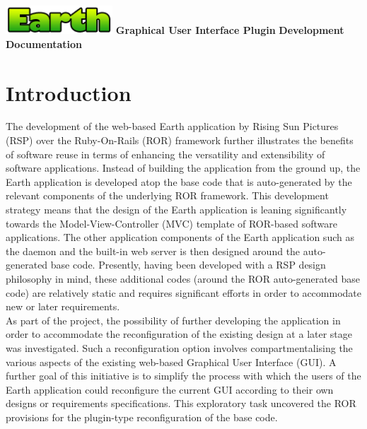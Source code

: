 \documentclass{article}
\begin{document}
\begin{titlepage}
\begin{center}
\includegraphics[width=40mm]{fig/earth}
\vfill
\textbf{\huge Graphical User Interface Plugin}
\vfill
\textbf{\huge Development Documentation}
\end{center}
\end{titlepage}

\tableofcontents
\listoffigures
\newpage

\section{Introduction} %

\noindent
The development of the web-based Earth application by Rising Sun Pictures (RSP) over the Ruby-On-Rails (ROR) framework further illustrates the benefits of software reuse in terms of enhancing the versatility and extensibility of software applications. Instead of building the application from the ground up, the Earth application is developed atop the base code that is auto-generated by the relevant components of the underlying ROR framework. This development strategy means that the design of the Earth application is leaning significantly towards the Model-View-Controller (MVC) template of ROR-based software applications. The other application components of the Earth application such as the daemon and the built-in web server is then designed around the auto-generated base code. Presently, having been developed with a RSP design philosophy in mind, these additional codes (around the ROR auto-generated base code) are relatively static and requires significant efforts in order to accommodate new or later requirements. \\

\noindent
As part of the project, the possibility of further developing the application in order to accommodate the reconfiguration of the existing design at a later stage was investigated. Such a reconfiguration option involves compartmentalising the various aspects of the existing web-based Graphical User Interface (GUI). A further goal of this initiative is to simplify the process with which the users of the Earth application could reconfigure the current GUI according to their own designs or requirements specifications. This exploratory task uncovered the ROR provisions for the plugin-type reconfiguration of the base code. \\
\end{document}
